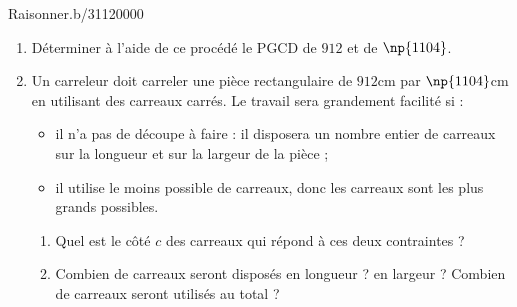 \begin{pageAuto}
\begin{ExoAuto}{Raisonner.}{b/311}{2}{0}{0}{0}{0}
\begin{enumerate}[leftmargin=*]

\item Déterminer à l'aide de ce procédé le PGCD de $912$ et de $\np{1104}$. 
\item 
  Un carreleur doit carreler une pièce rectangulaire de $912$cm par
  $\np{1104}$cm
  en utilisant des carreaux carrés. Le travail sera grandement facilité
  si :
  \begin{itemize}
  \item il n'a pas de découpe à faire : il disposera un nombre entier
    de carreaux sur la longueur et sur la largeur de la pièce ;
  \item il utilise le moins possible de carreaux, donc les carreaux
    sont les plus grands possibles.
    
  \end{itemize}
  \begin{enumerate}
  \item Quel est le côté $c$ des carreaux qui répond à ces deux contraintes ?
  \item Combien de carreaux seront disposés en longueur ? en largeur ?
    Combien de carreaux seront utilisés au total ?
  \end{enumerate}
\end{enumerate}
\end{ExoAuto}

\end{pageAuto}





